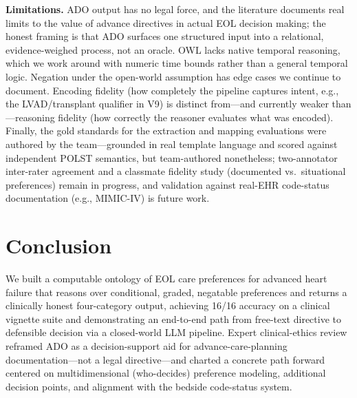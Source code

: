 \documentclass[10pt]{article}
\begin{document}
\textbf{Limitations.} ADO output has no legal force, and the literature documents real limits to the value of advance directives in actual EOL decision making; the honest framing is that ADO surfaces one structured input into a relational, evidence-weighed process, not an oracle. OWL lacks native temporal reasoning, which we work around with numeric time bounds rather than a general temporal logic. Negation under the open-world assumption has edge cases we continue to document. Encoding fidelity (how completely the pipeline captures intent, e.g., the LVAD/transplant qualifier in V9) is distinct from---and currently weaker than---reasoning fidelity (how correctly the reasoner evaluates what was encoded). Finally, the gold standards for the extraction and mapping evaluations were authored by the team---grounded in real template language and scored against independent POLST semantics, but team-authored nonetheless; two-annotator inter-rater agreement and a classmate fidelity study (documented vs.\ situational preferences) remain in progress, and validation against real-EHR code-status documentation (e.g., MIMIC-IV) is future work.

\section{Conclusion}
We built a computable ontology of EOL care preferences for advanced heart failure that reasons over conditional, graded, negatable preferences and returns a clinically honest four-category output, achieving 16/16 accuracy on a clinical vignette suite and demonstrating an end-to-end path from free-text directive to defensible decision via a closed-world LLM pipeline. Expert clinical-ethics review reframed ADO as a decision-support aid for advance-care-planning documentation---not a legal directive---and charted a concrete path forward centered on multidimensional (who-decides) preference modeling, additional decision points, and alignment with the bedside code-status system.

\end{document}

